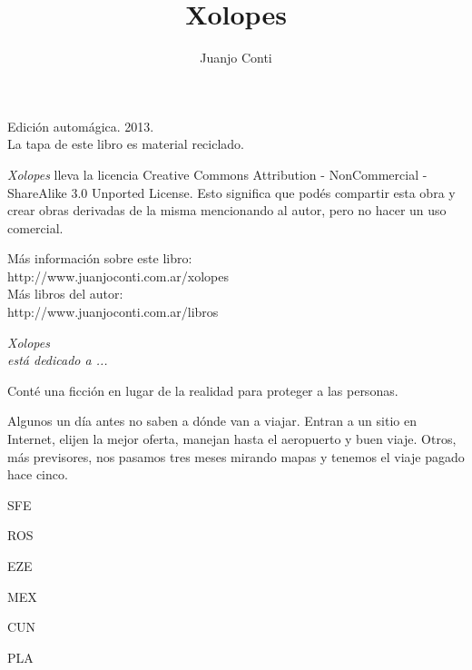 \documentclass[11pt,twoside,openright,a6paper]{book}
\title{Xolopes}
\author{Juanjo Conti}
\date{}
\begin{document}
\pagestyle{plain}

\maketitle

\cleardoublepage

\thispagestyle{empty}
\noindent
Edición automágica. 2013.\\
La tapa de este libro es material reciclado.

\vspace{0.5cm}

\noindent
\emph{Xolopes} lleva la licencia 
Creative Commons Attribution - NonCommercial - ShareAlike 3.0 Unported License.
Esto significa que podés compartir esta obra y crear obras derivadas de la misma
mencionando al autor, pero no ha\-cer un uso comercial.

\vfill

\noindent
Más información sobre este libro:\\
http://www.juanjoconti.com.ar/xolopes\\

\noindent
Más libros del autor:\\
http://www.juanjoconti.com.ar/libros

\cleardoublepage

\noindent
\begin{flushright}
\emph{
\emph{Xolopes}\\
está dedicado a ...
}
\end{flushright}

\cleardoublepage

Conté una ficción en lugar de la realidad para proteger a las personas.

\vspace{0.5cm}

Algunos un día antes no saben a dónde van a viajar. Entran a un sitio en Internet, elijen la mejor oferta, manejan hasta el aeropuerto y buen viaje. Otros, más previsores, nos pasamos tres meses mirando mapas y tenemos el viaje pagado hace cinco.

\vspace{0.5cm}

SFE

ROS

EZE

MEX

CUN

PLA

\vspace{0.5cm}
\end{document}
